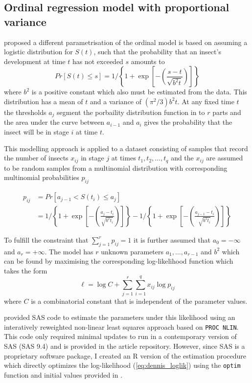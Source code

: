 \subsection{Ordinal regression model with proportional variance}
\citet{dennis1986stochastic} proposed a different parametrisation of the ordinal model is based on assuming a logistic distribution for $S(t)$, such that the probability that an insect's development at time $t$ has not exceeded $s$ amounts to 
\begin{equation}
Pr[S(t) \leq s] = 1 \bigg/ \left\{ 1 + \exp\left[-\left(\frac{s-t}{\sqrt{b^2t}}\right)\right]\right\}
\end{equation}
where $b^2$ is a positive constant which also must be estimated from the data. This distribution has a mean of $t$ and a variance of $(\pi^2/3)b^2t$.
At any fixed time $t$ the thresholds $a_j$ segment the porbaility distribution function in to $r$ parts and the area under the curve between $a_{i-1}$ and $a_i$ gives the probability that the insect will be in stage $i$ at time $t$.

This modelling approach is applied to a dataset consisting of samples that record the number of insects $x_{ij}$ in stage $j$ at times $t_1, t_2, \dots, t_q$ and the $x_{ij}$ are assumed to be random samples from a multinomial distribution with corresponding multinomial probabilities $p_{ij}$

\begin{align}
p_{ij} & = Pr[a_{j-1} < S(t_i) \leq a_{j}]\\
& = 1 \bigg/ \left\{ 1 + \exp\left[-\left(\frac{a_j-t_i}{\sqrt{b^2t_i}}\right)\right]\right\} - 1 \bigg/ \left\{ 1 + \exp\left[-\left(\frac{a_{j-1}-t_i}{\sqrt{b^2t_i}}\right)\right]\right\}
\end{align}

To fulfill the constraint that $\sum_{j=1}^r p_{ij}= 1$ it is further assumed that $a_0 = -\infty$ and $a_r = +\infty$.
The model has $r$ unknown parameters $a_1, \dots, a_{r-1}$ and $b^2$ which can be found by maximising the corresponding log-likelihood function which takes the form 
\begin{equation}
\mathcal{\ell} = \log C + \sum_{j=1}^r \sum_{i=1}^q x_{ij} \log p_{ij}
\label{eq:dennis_loglik}
\end{equation}
where $C$ is a combinatorial constant that is independent of the parameter values.

\citet{dennis1986stochastic} provided SAS code to estimate the parameters under this likelihood using an interatively reweighted non-linear least squares approach based on \verb+PROC NLIN+. This code only required minimal updates to run in a contemporary version of SAS (SAS 9.4) and is provided in the article repository. However, since SAS is a proprietary software package, I created an R version of the estimation procedure which directly optimizes the log-likelihood (\ref{eq:dennis_loglik}) using the \verb+optim+ function and initial values provided in \citep{dennis1986stochastic}.

